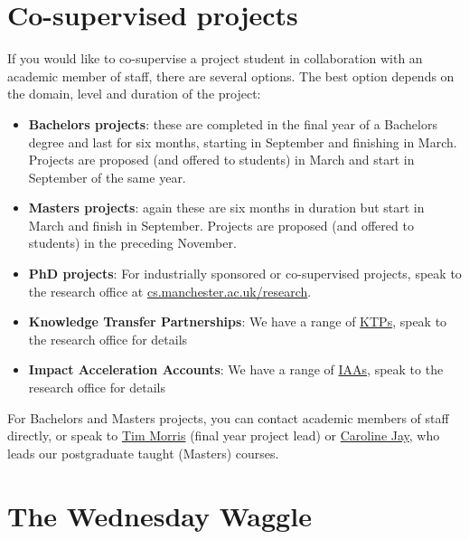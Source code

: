 \documentclass[
  12pt,
]{book}
\providecommand{\tightlist}{%
  \setlength{\itemsep}{0pt}\setlength{\parskip}{0pt}}
\begin{document}
\hypertarget{cosupervise}{%
\section{Co-supervised projects}\label{cosupervise}}

If you would like to co-supervise a project student in collaboration with an academic member of staff, there are several options. The best option depends on the domain, level and duration of the project:

\begin{itemize}
\tightlist
\item
  \textbf{Bachelors projects}: these are completed in the final year of a Bachelors degree and last for six months, starting in September and finishing in March. Projects are proposed (and offered to students) in March and start in September of the same year.
\item
  \textbf{Masters projects}: again these are six months in duration but start in March and finish in September. Projects are proposed (and offered to students) in the preceding November.
\item
  \textbf{PhD projects}: For industrially sponsored or co-supervised projects, speak to the research office at \href{https://www.cs.manchester.ac.uk/research/}{cs.manchester.ac.uk/research}.
\item
  \textbf{Knowledge Transfer Partnerships}: We have a range of \href{https://www.gov.uk/guidance/knowledge-transfer-partnerships-what-they-are-and-how-to-apply}{KTPs}, speak to the research office for details
\item
  \textbf{Impact Acceleration Accounts}: We have a range of \href{https://epsrc.ukri.org/innovation/fundingforimpact/impact-acceleration-accounts/}{IAAs}, speak to the research office for details
\end{itemize}

For Bachelors and Masters projects, you can contact academic members of staff directly, or speak to \href{https://www.research.manchester.ac.uk/portal/tim.morris.html}{Tim Morris} (final year project lead) or \href{https://www.research.manchester.ac.uk/portal/caroline.jay.html}{Caroline Jay}, who leads our postgraduate taught (Masters) courses.

\hypertarget{the-wednesday-waggle}{%
\section{The Wednesday Waggle}\label{the-wednesday-waggle}}
\end{document}
